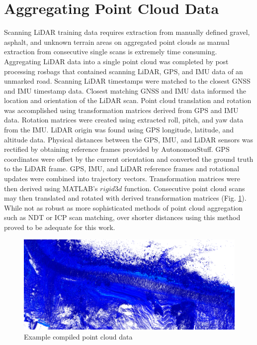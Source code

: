 \documentclass[numbered,pdftex]{ohio-etd}
\begin{document}
{	\section{Aggregating Point Cloud Data}\label{sec:aggregating_point_cloud_data}{
	
		{Scanning LiDAR training data requires extraction from manually defined gravel, asphalt, and unknown terrain areas on aggregated point clouds as manual extraction from consecutive single scans is extremely time consuming. Aggregating LiDAR data into a single point cloud was completed by post processing rosbags that contained scanning LiDAR, GPS, and IMU data of an unmarked road. Scanning LiDAR timestamps were matched to the closest GNSS and IMU timestamp data. Closest matching GNSS and IMU data informed the location and orientation of the LiDAR scan. Point cloud translation and rotation was accomplished using transformation matrices derived from GPS and IMU data. Rotation matrices were created using extracted roll, pitch, and yaw data from the IMU. LiDAR origin was found using GPS longitude, latitude, and altitude data. Physical distances between the GPS, IMU, and LiDAR sensors was rectified by obtaining reference frames provided by AutonomouStuff. GPS coordinates were offset by the current orientation and converted the ground truth to the LiDAR frame. GPS, IMU, and LiDAR reference frames and rotational updates were combined into trajectory vectors. Transformation matrices were then derived using MATLAB's $rigid3d$ function. Consecutive point cloud scans may then translated and rotated with derived transformation matrices (Fig. \ref{fig:Compiled_PCD}). While not as robust as more sophisticated methods of point cloud aggregation such as NDT or ICP scan matching, over shorter distances using this method proved to be adequate for this work.} 
		
		\begin{figure}[H]
			\centering
			\includegraphics[width=0.9\linewidth]{Defense_Images/pc_example}
			\caption[Compiled Point Cloud Data]{Example compiled point cloud data}
			\label{fig:Compiled_PCD}
		\end{figure}
	
}}
\end{document}
